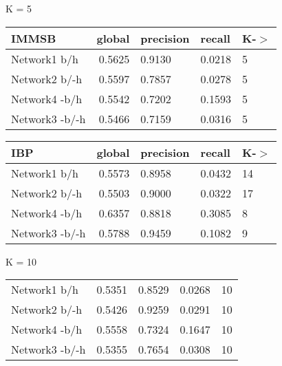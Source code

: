 \begin{table*}[h] \label{table:balanced}
\caption{Predictive Performance on a Balanced Testing set}
	\begin{minipage}[h]{0.45\linewidth} 
K =  5\hspace{5pt}
\begin{tabular}{lrlll}
\hline
 IMMSB   &   global &   precision &   recall &    K-\ensuremath{>} \\
\hline
 Network1 b/h           &   0.5625 &      0.9130 &   0.0218 & 5 \\
 Network2 b/-h        &   0.5597 &      0.7857 &   0.0278 & 5 \\
 Network4 -b/h         &   0.5542 &      0.7202 &   0.1593 & 5 \\
 Network3 -b/-h       &   0.5466 &      0.7159 &   0.0316 & 5 \\
\hline
\end{tabular}
\end{minipage}
\hspace{0.8cm}
\begin{minipage}[h]{0.45\linewidth}
\begin{tabular}{lrlll}
\hline
 IBP   &   global &   precision &   recall &     K-\ensuremath{>} \\
\hline
 Network1 b/h         &   0.5573 &      0.8958 &   0.0432 & 14 \\
 Network2 b/-h      &   0.5503 &      0.9000 &   0.0322 & 17 \\
 Network4 -b/h       &   0.6357 &      0.8818 &   0.3085 &  8 \\
 Network3 -b/-h     &   0.5788 &      0.9459 &   0.1082 &  9 \\
\hline
\end{tabular}
\end{minipage}


	\begin{minipage}[h]{0.45\linewidth} 
K = 10
\begin{tabular}{lrrrr}
 Network1 b/h           &   0.5351 &      0.8529 &   0.0268 & 10 \\
 Network2 b/-h        &   0.5426 &      0.9259 &   0.0291 & 10 \\
 Network4 -b/h         &   0.5558 &      0.7324 &   0.1647 & 10 \\
 Network3 -b/-h       &   0.5355 &      0.7654 &   0.0308 & 10 \\
\hline
\end{tabular}
\end{minipage}
\hspace{0.8cm}
\begin{minipage}[h]{0.45\linewidth}
\begin{tabular}{lrrrr}


\end{tabular}
\end{minipage}
\end{table*}
